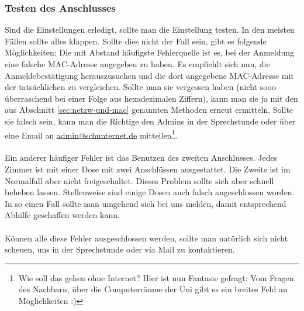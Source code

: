 \subsubsection{Testen des Anschlusses}
Sind die Einstellungen erledigt, sollte man die Einstellung
testen. In den meisten Fällen sollte alles klappen. Sollte dies nicht
der Fall sein, gibt es folgende Möglichkeiten: Die mit Abstand
häufigste Fehlerquelle ist es, bei der Anmeldung eine falsche
MAC-Adresse angegeben zu haben. Es empfiehlt sich nun, die
Anmeldebestätigung herauszusuchen und die dort angegebene MAC-Adresse
mit der tatsächlichen zu vergleichen. Sollte man sie vergessen haben
(nicht sooo überraschend bei einer Folge aus hexadezimalen Ziffern),
kann man sie ja mit den aus Abschnitt \ref{sec:netzw-und-mac}
genannten Methoden erneut ermitteln. Sollte sie falsch sein, kann man
die Richtige den Admins in der Sprechstunde oder über eine Email an
\url{admin@schunternet.de} mitteilen\footnote{Wie soll das gehen ohne
  Internet? Hier ist nun Fantasie gefragt: Vom Fragen des Nachbarn,
  über die Computerräume der Uni gibt es ein breites Feld an
  Möglichkeiten :)}.\\\\
Ein anderer häufiger Fehler ist das Benutzen des zweiten
Anschlusses. Jedes Zimmer ist mit einer Dose mit zwei Anschlüssen
ausgestattet. Die Zweite ist im Normalfall aber nicht
freigeschaltet. Dieses Problem sollte sich aber schnell beheben
lassen. Stellenweise sind einige Dosen auch falsch angeschlossen
worden. In so einen Fall sollte man umgehend sich bei uns melden, 
damit entsprechend Abhilfe geschaffen werden kann.\\\\

Können alle diese Fehler ausgeschlossen werden,  sollte man natürlich sich nicht scheuen, uns in der Sprechstunde oder via Mail zu kontaktieren.
%
